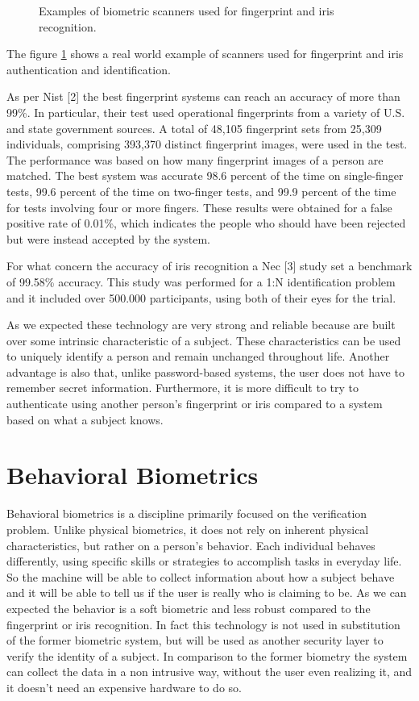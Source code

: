 \documentclass[12pt]{report}
\begin{document}
\begin{figure}[htbp]
    \vspace{10pt}
    \captionsetup{justification=centering, font=small}
    \caption{Examples of biometric scanners used for fingerprint and iris recognition.}
    \label{fig:scanners}
\end{figure}



The figure \ref{fig:scanners} shows a real world example of scanners used for fingerprint and iris authentication and identification.

As per Nist [2] the best fingerprint systems can reach an accuracy of more than 99\%.
In particular, their test used operational fingerprints from a variety of U.S. and state government sources. 
A total of 48,105 fingerprint sets from 25,309 individuals, comprising 393,370 distinct fingerprint images, were used in the test.
The performance was based on how many fingerprint images of a person are matched.
The best system was accurate 98.6 percent of the time on single-finger tests, 99.6 percent of the time on two-finger tests, and 99.9 percent of the time for tests involving four or more fingers.
These results were obtained for a false positive rate of 0.01\%, which indicates the people who should have been rejected but were instead accepted by the system.

For what concern the accuracy of iris recognition a Nec [3] study set a benchmark of 99.58\% accuracy.
This study was performed for a 1:N identification problem and it included over 500.000 participants, using both of their eyes for the trial.

As we expected these technology are very strong and reliable because are built over some intrinsic characteristic of a subject.
These characteristics can be used to uniquely identify a person and remain unchanged throughout life.
Another advantage is also that, unlike password-based systems, the user does not have to remember secret information.
Furthermore, it is more difficult to try to authenticate using another person's fingerprint or iris compared to a system based on what a subject knows.

\section{Behavioral Biometrics}

Behavioral biometrics is a discipline primarily focused on the verification problem.
Unlike physical biometrics, it does not rely on inherent physical characteristics, but rather on a person's behavior. 
Each individual behaves differently, using specific skills or strategies to accomplish tasks in everyday life.
So the machine will be able to collect information about how a subject behave and it will be able to tell us if the user is really who is claiming to be.
As we can expected the behavior is a soft biometric and less robust compared to the fingerprint or iris recognition.
In fact this technology is not used in substitution of the former biometric system, but will be used as another security layer to verify the identity of a subject.
In comparison to the former biometry the system can collect the data in a non intrusive way, without the user even realizing it, and it doesn't need an expensive hardware to do so.
\end{document}
